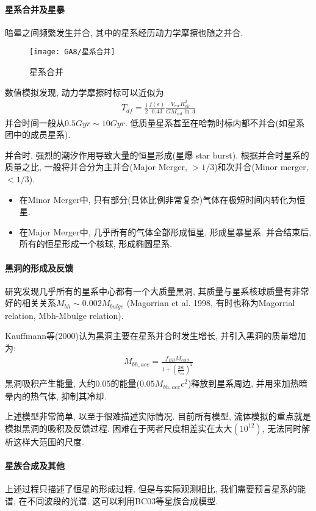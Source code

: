 \paragraph{星系合并及星暴}
暗晕之间频繁发生并合, 其中的星系经历动力学摩擦也随之并合. 
\begin{figure}[!htb]
    \centering
    \texttt{[image: GA8/星系合并]}
    \caption{星系合并}
\end{figure}

数值模拟发现, 动力学摩擦时标可以近似为
\begin{align*}
    T_{df}=\frac{1}{2}\frac{f(\epsilon)}{0.43}\frac{V_{vir}R_{vir}^2}{GM_{sat}\ln \Lambda}
\end{align*}
并合时间一般从$0.5 Gyr\sim 10 Gyr$. 低质量星系甚至在哈勃时标内都不并合(如星系团中的成员星系). 

并合时, 强烈的潮汐作用导致大量的恒星形成(星爆 star burst). 根据并合时星系的质量之比, 一般将并合分为主并合(Major Merger, $>1/3$)和次并合(Minor merger, $<1/3$). 
\begin{itemize}
    \item 在Minor Merger中, 只有部分(具体比例非常复杂)气体在极短时间内转化为恒星. 
    \item 在Major Merger中, 几乎所有的气体全部形成恒星, 形成星暴星系. 并合结束后, 所有的恒星形成一个核球, 形成椭圆星系. 
\end{itemize}

\paragraph{黑洞的形成及反馈}
研究发现几乎所有的星系中心都有一个大质量黑洞, 其质量与星系核球质量有非常好的相关关系$M_{bh}\sim 0.002M_{bulge}$ (Magorrian et al. 1998, 有时也称为Magorrial relation, Mbh-Mbulge relation).

Kauffmann等(2000)认为黑洞主要在星系并合时发生增长, 并引入黑洞的质量增加为:
\begin{align*}
    M_{bh, acc}=\frac{f_{BH}M_{cold}}{1+\left( \frac{280}{V_{vir}} \right)^2}
\end{align*}
黑洞吸积产生能量, 大约0.05的能量($0.05M_{bh,acc}c^2$)释放到星系周边, 并用来加热暗晕内的热气体, 抑制其冷却. 

上述模型非常简单, 以至于很难描述实际情况. 目前所有模型, 流体模拟的重点就是模拟黑洞的吸积及反馈过程. 困难在于两者尺度相差实在太大$(10^{12})$, 无法同时解析这样大范围的尺度. 

\paragraph{星族合成及其他}
上述过程只描述了恒星的形成过程, 但是与实际观测相比, 我们需要预言星系的能谱, 在不同波段的光谱. 这可以利用BC03等星族合成模型. 

